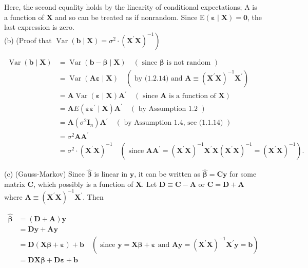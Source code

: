\documentclass[10pt]{article}
\begin{document}
Here, the second equality holds by the linearity of conditional expectations; A is a function of $\mathbf{X}$ and so can be treated as if nonrandom. Since $\mathrm{E}(\boldsymbol{\varepsilon} \mid \mathbf{X})=\mathbf{0}$, the last expression is zero.\\
(b) (Proof that $\left.\operatorname{Var}(\mathbf{b} \mid \mathbf{X})=\sigma^{2} \cdot\left(\mathbf{X}^{\prime} \mathbf{X}\right)^{-1}\right)$

$$
\begin{aligned}
\operatorname{Var}(\mathbf{b} \mid \mathbf{X}) & =\operatorname{Var}(\mathbf{b}-\boldsymbol{\beta} \mid \mathbf{X}) \quad(\text { since } \boldsymbol{\beta} \text { is not random }) \\
& =\operatorname{Var}(\mathbf{A} \boldsymbol{\varepsilon} \mid \mathbf{X}) \quad\left(\text { by (1.2.14) and } \mathbf{A} \equiv\left(\mathbf{X}^{\prime} \mathbf{X}\right)^{-1} \mathbf{X}^{\prime}\right) \\
& =\mathbf{A} \operatorname{Var}(\boldsymbol{\varepsilon} \mid \mathbf{X}) \mathbf{A}^{\prime} \quad(\text { since } \mathbf{A} \text { is a function of } \mathbf{X}) \\
& =\mathbf{A} E\left(\boldsymbol{\varepsilon} \boldsymbol{\varepsilon}^{\prime} \mid \mathbf{X}\right) \mathbf{A}^{\prime} \quad(\text { by Assumption 1.2 }) \\
& =\mathbf{A}\left(\sigma^{2} \mathbf{I}_{n}\right) \mathbf{A}^{\prime} \quad(\text { by Assumption 1.4, see (1.1.14) }) \\
& =\sigma^{2} \mathbf{A} \mathbf{A}^{\prime} \\
& =\sigma^{2} \cdot\left(\mathbf{X}^{\prime} \mathbf{X}\right)^{-1} \quad\left(\text { since } \mathbf{A} \mathbf{A}^{\prime}=\left(\mathbf{X}^{\prime} \mathbf{X}\right)^{-1} \mathbf{X}^{\prime} \mathbf{X}\left(\mathbf{X}^{\prime} \mathbf{X}\right)^{-1}=\left(\mathbf{X}^{\prime} \mathbf{X}\right)^{-1}\right) .
\end{aligned}
$$

(c) (Gauss-Markov) Since $\widehat{\boldsymbol{\beta}}$ is linear in $\mathbf{y}$, it can be written as $\widehat{\boldsymbol{\beta}}=\mathbf{C y}$ for some matrix $\mathbf{C}$, which possibly is a function of $\mathbf{X}$. Let $\mathbf{D} \equiv \mathbf{C}-\mathbf{A}$ or $\mathbf{C}=\mathbf{D}+\mathbf{A}$ where $\mathbf{A} \equiv\left(\mathbf{X}^{\prime} \mathbf{X}\right)^{-1} \mathbf{X}^{\prime}$. Then

$$
\begin{aligned}
\widehat{\boldsymbol{\beta}} & =(\mathbf{D}+\mathbf{A}) \mathbf{y} \\
& =\mathbf{D} \mathbf{y}+\mathbf{A} \mathbf{y} \\
& =\mathbf{D}(\mathbf{X} \boldsymbol{\beta}+\boldsymbol{\varepsilon})+\mathbf{b} \quad\left(\text { since } \mathbf{y}=\mathbf{X} \boldsymbol{\beta}+\boldsymbol{\varepsilon} \text { and } \mathbf{A} \mathbf{y}=\left(\mathbf{X}^{\prime} \mathbf{X}\right)^{-1} \mathbf{X}^{\prime} \mathbf{y}=\mathbf{b}\right) \\
& =\mathbf{D} \mathbf{X} \boldsymbol{\beta}+\mathbf{D} \boldsymbol{\varepsilon}+\mathbf{b}
\end{aligned}
$$
\end{document}
